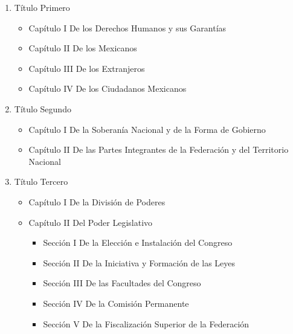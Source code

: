 \documentclass[12pt]{article}
\begin{document}
			\begin{enumerate}
				\item Título Primero 
					\begin{itemize}
						\item Capítulo I De los Derechos Humanos y sus Garantías
						
						\item Capítulo II De los Mexicanos
						
						\item Capítulo III De los Extranjeros
						
						\item Capítulo IV De los Ciudadanos Mexicanos
					\end{itemize}
				
				
				\item Título Segundo 
					\begin{itemize}
						\item Capítulo I De la Soberanía Nacional y de la Forma de Gobierno
									
						\item Capítulo II De las Partes Integrantes de la Federación y del Territorio Nacional
					\end{itemize}
				
				\item Título Tercero
				
					\begin{itemize}
						\item Capítulo I De la División de Poderes
						
						\item Capítulo II Del Poder Legislativo
						
							\begin{itemize}										
								\item Sección I De la Elección e Instalación del Congreso
								
								\item Sección II De la Iniciativa y Formación de las Leyes
								
								\item Sección III De las Facultades del Congreso
								
								\item Sección IV De la Comisión Permanente
								
								\item Sección V De la Fiscalización Superior de la Federación 
							\end{itemize}


\end{itemize}
\end{enumerate}
\end{document}
